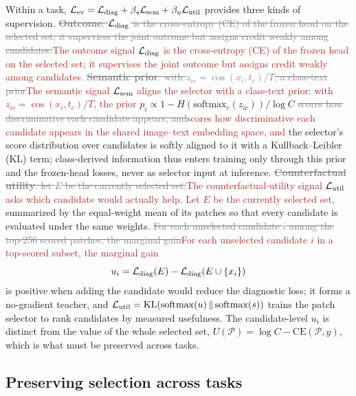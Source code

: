 \documentclass{article}
\newif\ifmarkup \markuptrue
\newcommand{\repc}[3]{\ifmarkup\textcolor{gray}{\sout{#2}}\textcolor{#1}{#3}\else#3\fi}
\newcommand{\repB}[2]{\repc{brown}{#1}{#2}}   %
\def\L{{\cal L}}
\newcommand{\Psel}{\mathcal{P}}
\begin{document}
Within a task, $\L_{\mathrm{ev}}=\L_{\mathrm{diag}}+\beta_s\L_{\mathrm{sem}}+\beta_u\L_{\mathrm{util}}$ provides three kinds of supervision. \repB{\textbf{Outcome}: $\L_{\mathrm{diag}}$ is the cross-entropy (CE) of the frozen head on the selected set; it supervises the joint outcome but assigns credit weakly among candidates.}{The outcome signal $\L_{\mathrm{diag}}$ is the cross-entropy (CE) of the frozen head on the selected set; it supervises the joint outcome but assigns credit weakly among candidates.} \repB{\textbf{Semantic prior}: with $z_{ic}=\cos(x_i,t_c)/T$, a class-text prior}{The semantic signal $\L_{\mathrm{sem}}$ aligns the selector with a class-text prior: with $z_{ic}=\cos(x_i,t_c)/T$, the prior} $p_i\propto 1-H(\mathrm{softmax}_c(z_{ic}))/\log C$ \repB{scores how discriminative each candidate appears, and}{scores how discriminative each candidate appears in the shared image--text embedding space, and} the selector's score distribution over candidates is softly aligned to it with a Kullback--Leibler (KL) term; class-derived information thus enters training only through this prior and the frozen-head losses, never as selector input at inference. \repB{\textbf{Counterfactual utility}: let $E$ be the currently selected set,}{The counterfactual-utility signal $\L_{\mathrm{util}}$ asks which candidate would actually help. Let $E$ be the currently selected set,} summarized by the equal-weight mean of its patches so that every candidate is evaluated under the same weights. \repB{For each unselected candidate $i$ among the top-256 scored patches, the marginal gain}{For each unselected candidate $i$ in a top-scored subset, the marginal gain}
\begin{equation}
u_i
=
\L_{\mathrm{diag}}(E)
-
\L_{\mathrm{diag}}(E\cup\{x_i\})
\label{eq:ui}
\end{equation}
is positive when adding the candidate would reduce the diagnostic loss; it forms a no-gradient teacher, and $\L_{\mathrm{util}}=\mathrm{KL}(\mathrm{softmax}(u)\,\Vert\,\mathrm{softmax}(s))$ trains the patch selector to rank candidates by measured usefulness. The candidate-level $u_i$ is distinct from the value of the whole selected set, $U(\Psel)=\log C-\mathrm{CE}(\Psel,y)$, which is what must be preserved across tasks.

\subsection{Preserving selection across tasks}
\label{ssec:cl}
\end{document}
